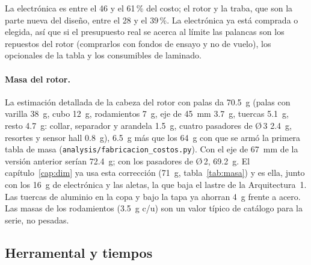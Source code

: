 La electrónica es entre el 46 y el 61\,\% del costo; el rotor y la traba, que son la parte
nueva del diseño, entre el 28 y el 39\,\%. La electrónica ya está comprada o elegida, así que si el
presupuesto real se acerca al límite las palancas son los repuestos del rotor (comprarlos con
fondos de ensayo y no de vuelo), los opcionales de la tabla y los consumibles de laminado.

\paragraph{Masa del rotor.} La estimación detallada de la cabeza del rotor con palas da
\SI{70.5}{g} (palas con varilla \SI{38}{g}, cubo \SI{12}{g}, rodamientos \SI{7}{g}, eje de \SI{45}{mm}
\SI{3.7}{g}, tuercas \SI{5.1}{g}, resto \SI{4.7}{g}: collar, separador y arandela \SI{1.5}{g}, cuatro pasadores
de Ø\,3 \SI{2.4}{g}, resortes y sensor hall \SI{0.8}{g}), \SI{6.5}{g} más que los \SI{64}{g} con que se armó la
primera tabla de masa (\texttt{analysis/fabricacion\_costos.py}). Con el eje de \SI{67}{mm} de la versión
anterior serían \SI{72.4}{g}; con los pasadores de Ø\,2, \SI{69.2}{g}. El capítulo~\ref{cap:dim} ya usa esta
corrección (\SI{71}{g}, tabla~\ref{tab:masa}) y es ella, junto con los \SI{16}{g} de electrónica y las aletas, la
que baja el lastre de la Arquitectura~1. Las tuercas de aluminio en la copa y bajo la tapa ya ahorran
\SI{4}{g} frente a acero. Las masas de los rodamientos (\SI{3.5}{g} c/u) son un valor
típico de catálogo para la serie, no pesadas.

\subsection{Herramental y tiempos}


